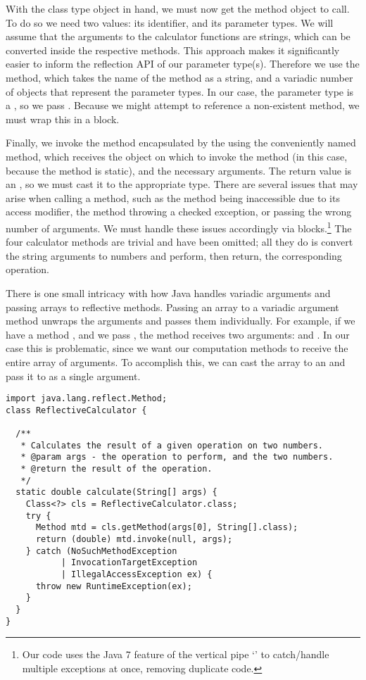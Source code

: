 With the class type object in hand, we must now get the method object to call. To do so we need two values: its identifier, and its parameter types. We will assume that the arguments to the calculator functions are strings, which can be converted inside the respective methods. This approach makes it significantly easier to inform the reflection API of our parameter type(s). Therefore we use the  method, which takes the name of the method as a string, and a variadic number of  objects that represent the parameter types. In our case, the parameter type is a , so we pass . Because we might attempt to reference a non-existent method, we must wrap this in a  block.

Finally, we invoke the method encapsulated by the  using the conveniently named  method, which receives the object on which to invoke the method (in this case,  because the method is static), and the necessary arguments. The return value is an , so we must cast it to the appropriate type. There are several issues that may arise when calling a method, such as the method being inaccessible due to its access modifier, the method throwing a checked exception, or passing the wrong number of arguments. We must handle these issues accordingly via  blocks.\footnote{Our code uses the Java 7 feature of the vertical pipe `\ttt{|}' to catch/handle multiple exceptions at once, removing duplicate code.} The four calculator methods are trivial and have been omitted; all they do is convert the string arguments to numbers and perform, then return, the corresponding operation.

There is one small intricacy with how Java handles variadic arguments and passing arrays to reflective methods. Passing an array to a variadic argument method unwraps the arguments and passes them individually. For example, if we have a method , and we pass , the method receives two arguments:  and . In our case this is problematic, since we want our computation methods to receive the entire array of arguments. To accomplish this, we can cast the array to an  and pass it to  as a single argument.

\begin{lstlisting}[language=MyJava]
import java.lang.reflect.Method;
class ReflectiveCalculator {

  /**
   * Calculates the result of a given operation on two numbers.
   * @param args - the operation to perform, and the two numbers.
   * @return the result of the operation.
   */
  static double calculate(String[] args) {
    Class<?> cls = ReflectiveCalculator.class;
    try {
      Method mtd = cls.getMethod(args[0], String[].class);
      return (double) mtd.invoke(null, args);
    } catch (NoSuchMethodException
           | InvocationTargetException
           | IllegalAccessException ex) {
      throw new RuntimeException(ex);
    }
  }
}
\end{lstlisting}

